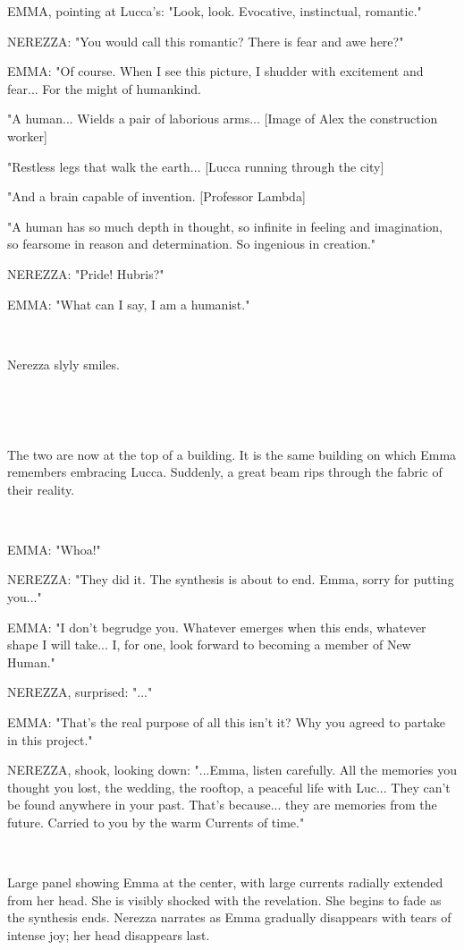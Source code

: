 \documentclass[11pt]{article}
\begin{document}
EMMA, pointing at Lucca's: "Look, look. Evocative, instinctual, romantic."

NEREZZA: "You would call this romantic? There is fear and awe here?"

EMMA: "Of course. 
When I see this picture, I shudder with excitement and fear...
For the might of humankind.

"A human... Wields a pair of laborious arms... [Image of Alex the construction worker]

"Restless legs that walk the earth... [Lucca running through the city]

"And a brain capable of invention. [Professor Lambda]

"A human has so much depth in thought,
so infinite in feeling and imagination,
so fearsome in reason and determination.
So ingenious in creation."

NEREZZA: "Pride! Hubris?"

EMMA: "What can I say, I am a humanist."

\ 

Nerezza slyly smiles.

\ 

\ 

The two are now at the top of a building.
It is the same building on which Emma remembers embracing Lucca. 
Suddenly, a great beam rips through the fabric of their reality.

\ 

EMMA: "Whoa!"

NEREZZA: "They did it. 
The synthesis is about to end.
Emma, sorry for putting you..."

EMMA: "I don't begrudge you. 
Whatever emerges when this ends, whatever shape I will take...
I, for one, look forward to becoming a member of New Human."

NEREZZA, surprised: "..."

EMMA: "That's the real purpose of all this isn't it?
Why you agreed to partake in this project."

NEREZZA, shook, looking down: "...Emma, listen carefully.
All the memories you thought you lost, the wedding, the rooftop, a peaceful life with Luc... They can't be found anywhere in your past. 
That's because... they are memories from the future.
Carried to you by the warm Currents of time."

\ 

Large panel showing Emma at the center, with large currents radially extended from her head.
She is visibly shocked with the revelation.
She begins to fade as the synthesis ends. 
Nerezza narrates as Emma gradually disappears with tears of intense joy; her head disappears last.
\end{document}
